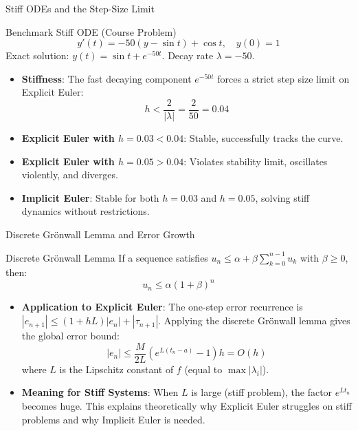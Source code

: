 \documentclass[aspectratio=169,10pt]{beamer}
\begin{document}
\begin{frame}{Stiff ODEs and the Step-Size Limit}
  \begin{block}{Benchmark Stiff ODE (Course Problem)}
    \[
      y'(t) = -50(y - \sin t) + \cos t, \quad y(0) = 1
    \]
    Exact solution: $y(t) = \sin t + e^{-50t}$. Decay rate $\lambda = -50$.
  \end{block}

  \begin{itemize}
    \item \textbf{Stiffness}: The fast decaying component $e^{-50t}$ forces a strict step size limit on Explicit Euler:
    \[
      h < \frac{2}{|\lambda|} = \frac{2}{50} = \mathbf{0.04}
    \]
    \item \textbf{Explicit Euler with $h = 0.03 < 0.04$}: Stable, successfully tracks the curve.
    \item \textbf{Explicit Euler with $h = 0.05 > 0.04$}: Violates stability limit, oscillates violently, and diverges.
    \item \textbf{Implicit Euler}: Stable for both $h=0.03$ and $h=0.05$, solving stiff dynamics without restrictions.
  \end{itemize}
\end{frame}

\begin{frame}{Discrete Gr\"onwall Lemma and Error Growth}
  \begin{block}{Discrete Gr\"onwall Lemma}
    If a sequence satisfies $u_n \le \alpha + \beta \sum_{k=0}^{n-1} u_k$ with $\beta \ge 0$, then:
    \[
      u_n \le \alpha (1 + \beta)^n
    \]
  \end{block}

  \begin{itemize}
    \item \textbf{Application to Explicit Euler}:
    The one-step error recurrence is $|e_{n+1}| \le (1 + hL)|e_n| + |\tau_{n+1}|$.
    Applying the discrete Gr\"onwall lemma gives the global error bound:
    \[
      |e_n| \le \frac{M}{2L} \left( e^{L(t_n - a)} - 1 \right) h = O(h)
    \]
    where $L$ is the Lipschitz constant of $f$ (equal to $\max |\lambda_i|$).

    \item \textbf{Meaning for Stiff Systems}:
    When $L$ is large (stiff problem), the factor $e^{Lt_n}$ becomes huge.
    This explains theoretically why Explicit Euler struggles on stiff problems and why Implicit Euler is needed.
  \end{itemize}
\end{frame}
\end{document}
